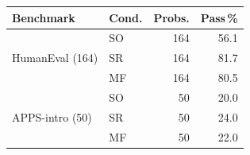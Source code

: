 \begin{tabular}{@{}llrr@{}}
\toprule
Benchmark & Cond. & Probs. & Pass\,\% \\
\midrule
\multirow{3}{*}{HumanEval (164)} & SO & 164 & 56.1 \\
& SR & 164 & 81.7 \\
& MF & 164 & 80.5 \\
\midrule
\multirow{3}{*}{APPS-intro (50)} & SO & 50 & 20.0 \\
& SR & 50 & 24.0 \\
& MF & 50 & 22.0 \\
\bottomrule
\end{tabular}
